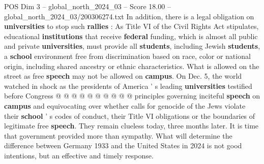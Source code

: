 \begin{textsample}{POS Dim 3 – global\_north\_2024\_03 – Score 18.00 – global\_north\_2024\_03/200306274.txt}
In addition, there is a legal obligation on \textbf{universities} to stop such \textbf{rallies} : As Title VI of the Civil Rights Act stipulates, educational \textbf{institutions} that receive \textbf{federal} funding, which is almost all public and private \textbf{universities}, must provide all \textbf{students}, including Jewish \textbf{students}, a \textbf{school} environment free from discrimination based on race, color or national origin, including shared ancestry or ethnic characteristics.
What is allowed on the street as free \textbf{speech} may not be allowed on \textbf{campus}.
On Dec. 5, the world watched in shock as the presidents of America ' s leading \textbf{universities} testified before Congress @ @ @ @ @ @ @ @ @ @ principles governing inciteful \textbf{speech} on \textbf{campus} and equivocating over whether calls for genocide of the Jews violate their \textbf{school} ' s codes of conduct, their Title VI obligations or the boundaries of legitimate free \textbf{speech}.
They remain clueless today, three months later.
It is time that government provided more than sympathy.
What will determine the difference between Germany 1933 and the United States in 2024 is not good intentions, but an effective and timely response.

\end{textsample}
